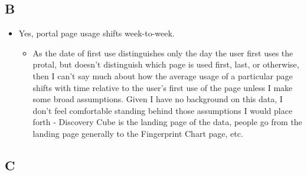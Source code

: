 \documentclass[11pt]{article}
\providecommand{\tightlist}{%
      \setlength{\itemsep}{0pt}\setlength{\parskip}{0pt}}
\begin{document}
\hypertarget{b}{%
\subsection{B}\label{b}}

\begin{itemize}
\tightlist
\item
  Yes, portal page usage shifts week-to-week.

  \begin{itemize}
  \tightlist
  \item
    As the date of first use distinguishes only the day the user first
    uses the protal, but doesn't distinguish which page is used first,
    last, or otherwise, then I can't say much about how the average
    usage of a particular page shifts with time relative to the user's
    first use of the page unless I make some broad assumptions. Given I
    have no background on this data, I don't feel comfortable standing
    behind those assumptions I would place forth - Discovery Cube is the
    landing page of the data, people go from the landing page generally
    to the Fingerprint Chart page, etc.
  \end{itemize}
\end{itemize}

\hypertarget{c}{%
\subsection{C}\label{c}}
\end{document}
